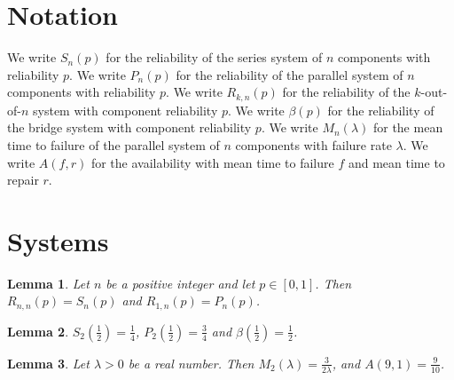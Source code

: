 \documentclass{article}
\newtheorem{lemma}{Lemma}
\begin{document}
\section{Notation}

We write $S_n(p)$ for the reliability of the series system of $n$ components with reliability $p$.
We write $P_n(p)$ for the reliability of the parallel system of $n$ components with reliability $p$.
We write $R_{k,n}(p)$ for the reliability of the $k$-out-of-$n$ system with component reliability $p$.
We write $\beta(p)$ for the reliability of the bridge system with component reliability $p$.
We write $M_n(\lambda)$ for the mean time to failure of the parallel system of $n$ components with failure rate $\lambda$.
We write $A(f,r)$ for the availability with mean time to failure $f$ and mean time to repair $r$.

\section{Systems}

\begin{lemma}\label{extremes}
Let $n$ be a positive integer and let $p\in[0,1]$. Then $R_{n,n}(p)=S_n(p)$ and $R_{1,n}(p)=P_n(p)$.
\end{lemma}

\begin{lemma}\label{values}
$S_2(\frac12)=\frac14$, $P_2(\frac12)=\frac34$ and $\beta(\frac12)=\frac12$.
\end{lemma}

\begin{lemma}\label{mttf}
Let $\lambda>0$ be a real number. Then $M_2(\lambda)=\frac{3}{2\lambda}$, and $A(9,1)=\frac{9}{10}$.
\end{lemma}
\end{document}

